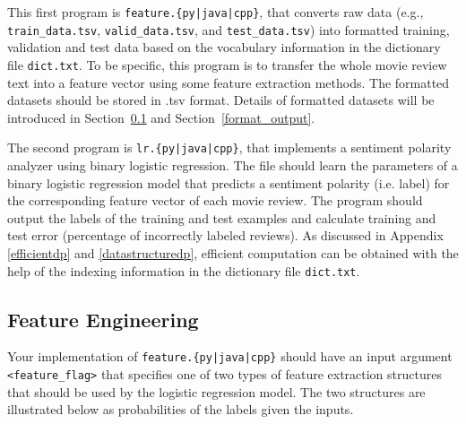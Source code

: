 \documentclass[11pt,addpoints,answers]{exam}
\begin{document}
This first program is \texttt{feature.\{py|java|cpp\}}, that converts raw data (e.g., \lstinline{train_data.tsv}, \lstinline{valid_data.tsv}, and \lstinline{test_data.tsv}) into formatted training, validation and test data based on the vocabulary information in the dictionary file \lstinline{dict.txt}. To be specific, this program is to transfer the whole movie review text into a feature vector using some feature extraction methods. The formatted datasets should be stored in .tsv format. Details of formatted datasets will be introduced in Section~\ref{feature} and Section~\ref{format_output}.

The second program is \texttt{lr.\{py|java|cpp\}}, that implements a sentiment polarity analyzer using binary logistic regression. The file should learn the parameters of a binary logistic regression model that predicts a sentiment polarity (i.e. label) for the corresponding feature vector of each movie review. The program should output the labels of the training and test examples and calculate training and test error (percentage of incorrectly labeled reviews). As discussed in Appendix \ref{efficientdp} and \ref{datastructuredp}, efficient computation can be obtained with the help of the indexing information in the dictionary file \lstinline{dict.txt}.

\subsection{Feature Engineering} \label{feature}

Your implementation of \texttt{feature.\{py|java|cpp\}} should have an input argument \texttt{<feature\_flag>} that specifies one of two types of feature extraction structures that should be used by the logistic regression model. The two structures are illustrated below as probabilities of the labels given the inputs.
\end{document}
